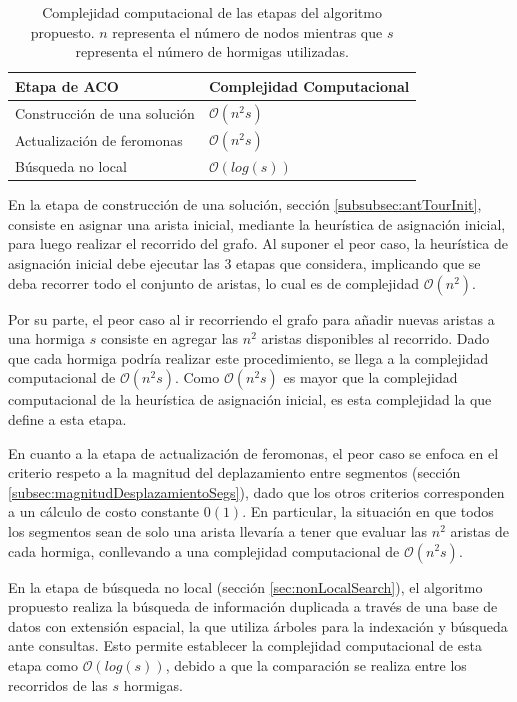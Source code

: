 \begin{table}[h]
    \centering
    \begin{tabular}{|l|l|}
    \hline
    Etapa de ACO & Complejidad Computacional \\\hline
    Construcci\'on de una soluci\'on & $\mathcal{O}{(n^{2}s)}$ \\
    Actualizaci\'on de feromonas & $\mathcal{O}{(n^{2}s)}$ \\
    B\'usqueda no local & $\mathcal{O}{(log(s))}$ \\
    \hline
    \end{tabular}
    \caption{Complejidad computacional de las etapas del algoritmo propuesto. $n$ representa el n\'umero de nodos mientras que $s$ representa el n\'umero de hormigas utilizadas.}
    \label{tab:computComplexity}
\end{table}

En la etapa de construcci\'on de una soluci\'on, secci\'on \ref{subsubsec:antTourInit}, consiste en asignar una arista inicial, mediante la heur\'istica de asignaci\'on inicial, para luego realizar el recorrido del grafo. Al suponer el peor caso, la heur\'istica de asignaci\'on inicial debe ejecutar las 3 etapas que considera, implicando que se deba recorrer todo el conjunto de aristas, lo cual es de complejidad $\mathcal{O}{(n^{2})}$.


Por su parte, el peor caso al ir recorriendo el grafo para a\~nadir nuevas aristas a una hormiga $s$ consiste en agregar las $n^2$ aristas disponibles al recorrido. Dado que cada hormiga podr\'ia realizar este procedimiento, se llega a la complejidad computacional de $\mathcal{O}{(n^{2}s)}$.
Como $\mathcal{O}{(n^{2}s)}$ es mayor que la complejidad computacional de la heur\'istica de asignaci\'on inicial, es esta complejidad la que define a esta etapa.

En cuanto a la etapa de actualizaci\'on de feromonas, el peor caso se enfoca en el criterio respeto a la magnitud del deplazamiento entre segmentos (secci\'on \ref{subsec:magnitudDesplazamientoSegs}), dado que los otros criterios corresponden a un c\'alculo de costo constante $\mathcal{0}{(1)}$. En particular, la situaci\'on en que todos los segmentos sean de solo una arista llevar\'ia a tener que evaluar las $n^2$ aristas de cada hormiga, conllevando a una complejidad computacional de $\mathcal{O}{(n^{2}s)}$.

En la etapa de b\'usqueda no local (secci\'on \ref{sec:nonLocalSearch}), el algoritmo propuesto realiza la b\'usqueda de informaci\'on duplicada a trav\'es de una base de datos con extensi\'on espacial, la que utiliza \'arboles para la indexaci\'on y b\'usqueda ante consultas. Esto permite establecer la complejidad computacional de esta etapa como $\mathcal{O}{(log(s))}$, debido a que la comparaci\'on se realiza entre los recorridos de las $s$ hormigas.

